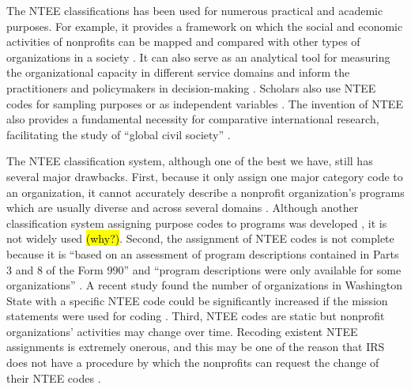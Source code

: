 \documentclass[12pt]{article}
\begin{document}
The NTEE classifications has been used for numerous practical and academic purposes. For example, it provides a framework on which the social and economic activities of nonprofits can be mapped and compared with other types of organizations in a society \parencite[e.g.,][]{RoegerNonprofitSectorIts2015}. It can also serve as an analytical tool for measuring the organizational capacity in different service domains and inform the practitioners and policymakers in decision-making \parencite{Hodgkinsonnewresearchplanning1991}. Scholars also use NTEE codes for sampling purposes \parencite[e.g.,][]{OktenDeterminantsdonationsprivate2000,CarmanEvaluationCapacityNonprofit2010} or as independent variables \parencite{SloanEffectsNonprofitAccountability2009}. The invention of NTEE also provides a fundamental necessity for comparative international research, facilitating the study of ``global civil society'' \parencite{VakilConfrontingclassificationproblem1997,Salamonsearchnonprofitsector1992,Salamoninternationalclassificationnonprofit1996,HodgkinsonMappingnonprofitsector1990}.

The NTEE classification system, although one of the best we have, still has several major drawbacks. First, because it only assign one major category code to an organization, it cannot accurately describe a nonprofit organization's programs which are usually diverse and across several domains \parencite[303]{GronbjergUsingNTEEclassify1994}. Although another classification system assigning purpose codes to programs was developed \parencite{LampkinIntroducingNonprofitProgram2001}, it is not widely used \hl{(why?)}. Second, the assignment of NTEE codes is not complete because it is ``based on an assessment of program descriptions contained in Parts 3 and 8 of the Form 990'' and ``program descriptions were only available for some organizations'' \parencite[16]{NationalCenterforCharitableStatisticsGuideUsingNCCS2006}. A recent study found the number of organizations in Washington State with a specific NTEE code could be significantly increased if the mission statements were used for coding \parencite{FyallNTEECodesOpportunities2018}. Third, NTEE codes are static but nonprofit organizations' activities may change over time. Recoding existent NTEE assignments is extremely onerous, and this may be one of the reason that IRS does not have a procedure by which the nonprofits can request the change of their NTEE codes \parencite{USInternalRevenueServiceIRSStaticFiles2013}.
\end{document}
